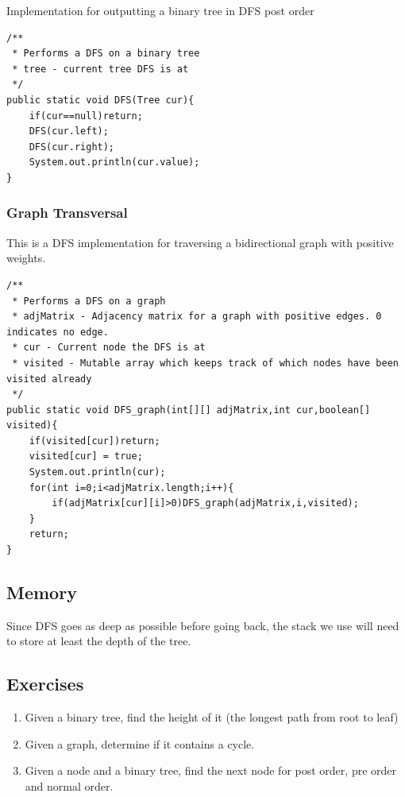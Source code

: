 \documentclass[11pt,oneside]{book}
\begin{document}
Implementation for outputting a binary tree in DFS post order

\begin{lstlisting}
/**
 * Performs a DFS on a binary tree
 * tree - current tree DFS is at
 */
public static void DFS(Tree cur){
    if(cur==null)return;
    DFS(cur.left);
    DFS(cur.right);
    System.out.println(cur.value);
}
\end{lstlisting}

\subsubsection{Graph Transversal}

This is a DFS implementation for traversing a bidirectional graph with positive weights.

\begin{lstlisting}
/**
 * Performs a DFS on a graph
 * adjMatrix - Adjacency matrix for a graph with positive edges. 0 indicates no edge.
 * cur - Current node the DFS is at
 * visited - Mutable array which keeps track of which nodes have been visited already
 */
public static void DFS_graph(int[][] adjMatrix,int cur,boolean[] visited){
    if(visited[cur])return;
    visited[cur] = true;
    System.out.println(cur);
    for(int i=0;i<adjMatrix.length;i++){
        if(adjMatrix[cur][i]>0)DFS_graph(adjMatrix,i,visited);
    }
    return;
}

\end{lstlisting}

\subsection{Memory}

Since DFS goes as deep as possible before going back, the stack we use will need to store at least the depth of the tree.

\subsection{Exercises}

\begin{enumerate}
\item Given a binary tree, find the height of it (the longest path from root to leaf)
\item Given a graph, determine if it contains a cycle.
\item Given a node and a binary tree, find the next node for post order, pre order and normal order.
\end{enumerate}
\end{document}

